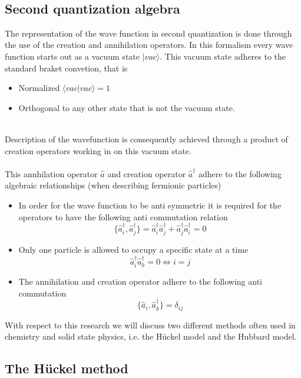\documentclass[]{article}
\begin{document}
\\
\subsection{Second quantization algebra}
The representation of the wave function in second quantization is done through the use of the creation and annihilation operators. In this formalism every wave function starts out as a vacuum state $\lvert vac \rangle$. This vacuum state adheres to the standard braket convetion, that is\cite{Surjan}
\begin{itemize}
	\item Normalized $\langle vac\rvert vac \rangle =1$
	\item Orthogonal to any other state that is not the vacuum state.
\end{itemize}
\\
Description of the wavefunction is consequently achieved through a product of creation operators working in on this vacuum state.
\\
\\
This annhilation operator $\hat{a}$ and creation operator $\hat{a}^\dagger$ adhere to the following algebraic relationships (when describing fermionic particles)
\begin{itemize}
	\item In order for the wave function to be anti symmetric it is required for the operators to have the following anti commutation relation
	\begin{equation}
		\{\hat{a}^\dagger_i, \hat{a}^\dagger_j\} = \hat{a}^\dagger_i\hat{a}^\dagger_j + \hat{a}^\dagger_j\hat{a}^\dagger_i = 0
	\end{equation}
	\item Only one particle is allowed to occupy a specific state at a time
	\begin{equation}
		\hat{a}^\dagger_i\hat{a}^\dagger_k = 0 \iff i=j
	\end{equation}
	\item The annihilation and creation operator adhere to the following anti commutation
	\begin{equation}
		\{ \hat{a}_{i}, \hat{a}^{\dagger}_{k} \} = \delta_{ij}
	\end{equation} 
\end{itemize}
With respect to this research we will discuss two different methods often used in chemistry and solid state physics, i.e. the Hückel model and the Hubbard model.

\subsection{The Hückel method}
\end{document}
